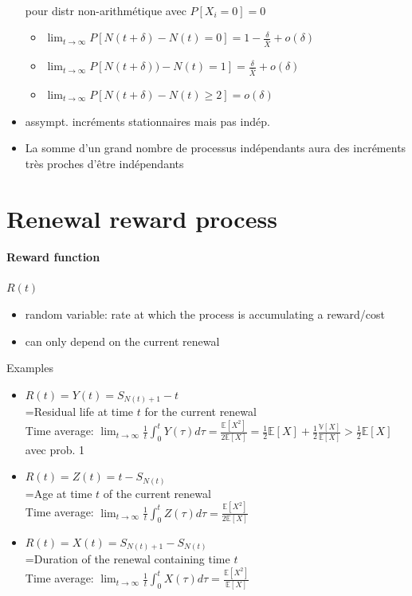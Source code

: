 \documentclass[paper=a4,fontsize=8pt,pagesize,DIV=calc]{scrartcl}
\begin{document}
\begin{multicols}{3}
\begin{itemize}
\\pour distr non-arithmétique avec $P[X_i = 0] = 0$
\begin{itemize}
\item $\lim_{t\to\infty} P[N(t + \delta) - N(t) = 0] = 1 - \frac{\delta}{\bar{X}} + o(\delta)$
\item $\lim_{t\to\infty}P[N(t + \delta) )- N(t) = 1] = \frac{\delta}{\bar{X}} + o(\delta)$
\item $\lim_{t\to\infty}P[N(t + \delta) - N(t) \geq 2] = o(\delta)$
\end{itemize}
\item  assympt. incréments stationnaires mais pas indép.
\item  La somme d'un grand nombre de processus indépendants aura des incréments très proches d'être indépendants
\end{itemize}
\section{Renewal reward process}
\paragraph{Reward function} $R(t)$ 
\begin{itemize}
\item random variable: rate at which the process is accumulating a reward/cost
\item can only depend on the
current renewal
\end{itemize}
Examples
\begin{itemize}
\item $R(t) = Y (t) = S_{N(t)+1} -t$
\\=Residual life at time $t$ for the current renewal
\\Time average:  $\lim_{t\to\infty} \frac{1}{t} \int_0^t Y(\tau) d\tau=\frac{\mathbb{E}[X^2]}{2\mathbb{E}[X]}=\frac{1}{2}\mathbb{E}[X]+\frac{1}{2}\frac{\mathbb{V}[X]}{\mathbb{E}[X]}>\frac{1}{2}\mathbb{E}[X]$ avec prob. 1
\item$R(t) = Z(t) = t - S_{N(t)}$
\\=Age at time $t$ of the current renewal
\\Time average:  $\lim_{t\to\infty} \frac{1}{t} \int_0^t Z(\tau) d\tau=\frac{\mathbb{E}[X^2]}{2\mathbb{E}[X]}$
\item$R(t) = X(t) = S_{N(t)+1}- S_{N(t)}$
\\=Duration of the renewal containing time $t$
\\Time average:  $\lim_{t\to\infty} \frac{1}{t} \int_0^t X(\tau) d\tau=\frac{\mathbb{E}[X^2]}{\mathbb{E}[X]}$
\end{itemize}

\end{multicols}
\end{document}
